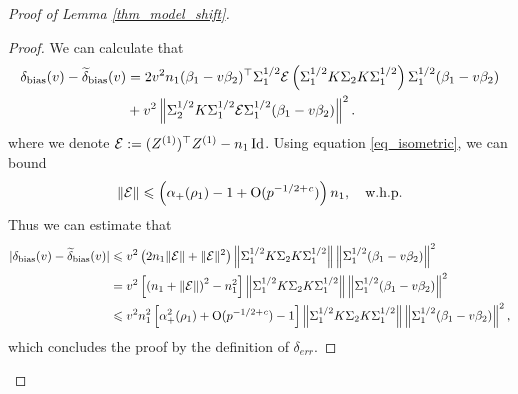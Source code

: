 \begin{proof}[Proof of Lemma \ref{thm_model_shift}]
\begin{proof}
We can calculate that
	\begin{align}
		 \delta_{\text{bias}}(v)-\widetilde\delta_{\text{bias}}(v)&= {2v^2n_1}(\beta_1 - v\beta_2)^{\top}\Sigma_1^{1/2} \mathcal{E}\left(\Sigma_1^{1/2}K \Sigma_2 K \Sigma_1^{1/2}\right) \Sigma_1^{1/2} (\beta_1 - v\beta_2) \nonumber
		\\
		&+ v^2\left\| \Sigma_2^{1/2} K \Sigma_1^{1/2}\mathcal{E} \Sigma_1^{1/2}(\beta_1 - v\beta_2) \right\|^2. \label{eq_lem_model_shift_1}
	\end{align}
	where we denote $\mathcal{E}: = (Z^{(1)})^{\top}Z^{(1)} - {n_1}\operatorname{Id}$.
  Using equation \eqref{eq_isometric}, we can bound
	$$\|\mathcal E\|\leqslant \left( \alpha_+(\rho_1)-1 + \operatorname{O}(p^{-1/2+{\mathit{c}}})\right)n_1, \quad \text{w.h.p.}$$
	Thus we can estimate that
	\begin{align*}
	| \delta_{\text{bias}}(v)-\widetilde\delta_{\text{bias}}(v)|&\leqslant v^2 \left( 2n_1  \|\mathcal E\| +  \|\mathcal E\|^2 \right) \left\| \Sigma_1^{1/2} K \Sigma_2 K \Sigma_1^{1/2} \right\| \left\| \Sigma_1^{1/2} (\beta_1 - v\beta_2) \right\|^2 \\
	&=  v^2 \left[\left( n_1 + \|\mathcal E\|\right)^2 -n_1^2 \right] \left\| \Sigma_1^{1/2} K \Sigma_2 K \Sigma_1^{1/2} \right\| \left\| \Sigma_1^{1/2} (\beta_1 - v\beta_2) \right\|^2 \\
	& \leqslant v^2 n_1^2 \left[ \alpha_+^2(\rho_1) + \operatorname{O}(p^{-1/2+{\mathit{c}}}) -1\right]\left\| \Sigma_1^{1/2} K \Sigma_2 K \Sigma_1^{1/2} \right\| \left\| \Sigma_1^{1/2} (\beta_1 - v\beta_2) \right\|^2,
	\end{align*}
	which concludes the proof by the definition of $\delta_{err}$.

\end{proof}
\end{proof}

